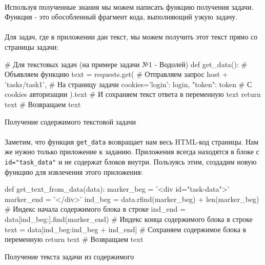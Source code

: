 \documentclass[12pt]{article}
\begin{document}
    \paragraph{}
    Используя полученные знания мы можем написать функцию получения задачи.
    Функция - это обособленный фрагмент кода, выполняющий узкую задачу.
    \paragraph{}
    Для задач, где в приложении дан текст, мы можем получить этот текст прямо со страницы задачи:

    \begin{listing}[H]
        \begin{pythoncode}
# Для текстовых задач (на примере задачи №1 - Водолей)
def get_data():                                   # Объявляем функцию
    text = requests.get(                          # Отправляем запрос
        host + 'tasks/task1',                     # На страницу задачи
        cookies={'login': login, "token": token}  # С cookies авторизации
    ).text                                        # И сохраняем текст ответа в переменную text
    return text                                   # Возвращаем text
        \end{pythoncode}
        \caption{Получение содержимого текстовой задачи}
        \label{lst:get_data_text}
    \end{listing}
    \paragraph{}
    Заметим, что функция \verb|get_data| возвращает нам весь HTML-код страницы.
    Нам же нужно только приложение к заданию.
    Приложения всегда находятся в блоке с \verb|id="task_data"| и не содержат блоков внутри.
    Пользуясь этим, создадим новую функцию для извлечения этого приложения:

    \begin{listing}[H]
        \begin{pythoncode}
def get_text_from_data(data):
    marker_beg = '<div id="task-data">'
    marker_end = '</div>'
    ind_beg = data.rfind(marker_beg) + len(marker_beg)  # Индекс начала содержимого блока в строке
    ind_end = data[ind_beg:].find(marker_end)           # Индекс конца содержимого блока в строке
    text = data[ind_beg:ind_beg + ind_end]              # Сохраняем содержимое блока в переменную
    return text                                         # Возвращаем text
        \end{pythoncode}
        \caption{Получение текста задачи из содержимого}
        \label{lst:get_text_from_data}
    \end{listing}
\end{document}
